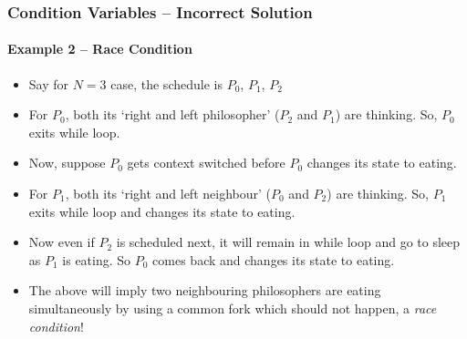 \documentclass[aspectratio=169, handout, 10pt]{beamer}
\theoremstyle{example}
\begin{document}
\begin{frame}[fragile]\frametitle{Condition Variables -- Incorrect Solution}\framesubtitle{Example 2 -- Race Condition}
  \begin{example}
  \begin{itemize}
  \pause\item Say for $N=3$ case, the schedule is $P_0$, $P_1$, $P_2$
  \pause\item For $P_0$, both its `right and left philosopher' ($P_2$ and $P_1$) are thinking. So, $P_0$ exits while loop.
  \pause\item Now, suppose $P_0$ gets context switched before $P_0$ changes its state to eating.
  \pause\item For $P_1$, both its `right and left neighbour' ($P_0$ and $P_2$) are thinking. So, $P_1$ exits while loop and changes its state to eating.
  \pause\item Now even if $P_2$ is scheduled next, it will remain in while loop and go to sleep as $P_1$ is eating. So $P_0$ comes back and changes its state to eating.
  \pause\item The above will imply two neighbouring philosophers are eating simultaneously by using a common fork which should not happen, a \emph{race condition}!
  \end{itemize}
  \end{example}
\end{frame}
\end{document}

